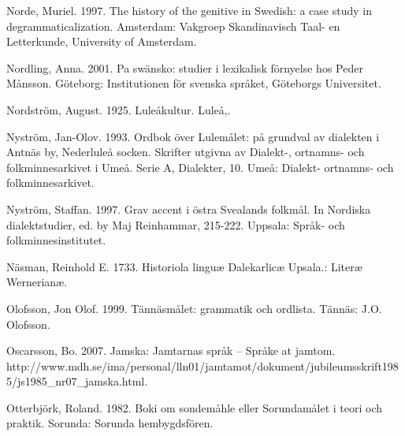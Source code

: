 Norde, Muriel. 1997. The history of the genitive in Swedish: a case study in degrammaticalization. Amsterdam: Vakgroep Skandinavisch Taal- en Letterkunde, University of Amsterdam.


Nordling, Anna. 2001. Pa swänsko: studier i lexikalisk förnyelse hos Peder Månsson. Göteborg: Institutionen för svenska språket, Göteborgs Universitet.


Nordström, August. 1925. Luleåkultur. Luleå,.


Nyström, Jan-Olov. 1993. Ordbok över Lulemålet: på grundval av dialekten i Antnäs by, Nederluleå socken. Skrifter utgivna av Dialekt-, ortnamns- och folkminnesarkivet i Umeå. Serie A, Dialekter, 10. Umeå: Dialekt- ortnamns- och folkminnesarkivet.


Nyström, Staffan. 1997. Grav accent i östra Svealands folkmål. In Nordiska dialektstudier, ed. by Maj Reinhammar, 215-222. Uppsala: Språk- och folkminnesinstitutet.


Näsman, Reinhold E. 1733. Historiola linguæ Dalekarlicæ Upsala.: Literæ Wernerianæ.


Olofsson, Jon Olof. 1999. Tännäsmålet: grammatik och ordlista. Tännäs: J.O. Olofsson.


Oscarsson, Bo. 2007. Jamska: Jamtarnas språk  –  Språke at jamtom. http://www.mdh.se/ima/personal/lln01/jamtamot/dokument/jubileumsskrift1985/js1985\_nr07\_jamska.html. 


Otterbjörk, Roland. 1982. Boki om sondemåhle eller Sorundamålet i teori och praktik. Sorunda: Sorunda hembygdsfören.


